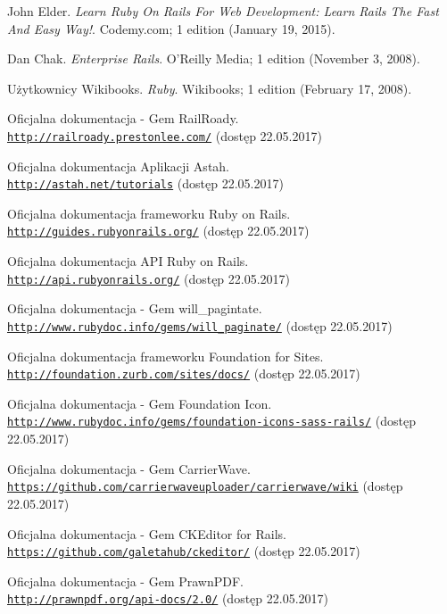 \documentclass[openright]{xmgr}
\begin{document}
\begin{thebibliography}{9}
John Elder.
\textit{Learn Ruby On Rails For Web Development: Learn Rails The Fast And Easy Way!}.
Codemy.com; 1 edition (January 19, 2015).

Dan Chak.
\textit{Enterprise Rails}.
O'Reilly Media; 1 edition (November 3, 2008).

Użytkownicy Wikibooks.
\textit{Ruby}.
Wikibooks; 1 edition (February 17, 2008).

Oficjalna dokumentacja - Gem RailRoady.
\\\texttt{\url{http://railroady.prestonlee.com/}} (dostęp 22.05.2017)

Oficjalna dokumentacja Aplikacji Astah.
\\\texttt{\url{http://astah.net/tutorials}} (dostęp 22.05.2017)

Oficjalna dokumentacja frameworku Ruby on Rails.
\\\texttt{\url{http://guides.rubyonrails.org/}} (dostęp 22.05.2017)

Oficjalna dokumentacja API Ruby on Rails.
\\\texttt{\url{http://api.rubyonrails.org/}} (dostęp 22.05.2017)

Oficjalna dokumentacja - Gem will\_pagintate.
\\\texttt{\url{http://www.rubydoc.info/gems/will_paginate/}} (dostęp 22.05.2017)

Oficjalna dokumentacja frameworku Foundation for Sites.
\\\texttt{\url{http://foundation.zurb.com/sites/docs/}} (dostęp 22.05.2017)

Oficjalna dokumentacja - Gem Foundation Icon.
\\\texttt{\url{http://www.rubydoc.info/gems/foundation-icons-sass-rails/}} (dostęp 22.05.2017)

Oficjalna dokumentacja - Gem CarrierWave.
\\\texttt{\url{https://github.com/carrierwaveuploader/carrierwave/wiki}} (dostęp 22.05.2017)

Oficjalna dokumentacja - Gem CKEditor for Rails.
\\\texttt{\url{https://github.com/galetahub/ckeditor/}} (dostęp 22.05.2017)

Oficjalna dokumentacja - Gem PrawnPDF.
\\\texttt{\url{http://prawnpdf.org/api-docs/2.0/}} (dostęp 22.05.2017)


\end{thebibliography}
\end{document}

